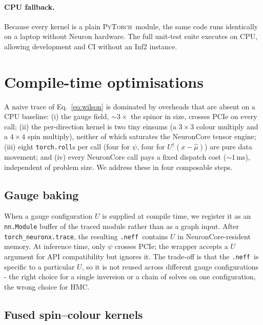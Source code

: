 \documentclass[a4paper,11pt]{article}
\newcommand{\NEFF}{\texttt{.neff}}
\newcommand{\PyT}{\textsc{PyTorch}}
\begin{document}
\paragraph*{CPU fallback.}
Because every kernel is a plain \PyT\ module, the same code runs
identically on a laptop without Neuron hardware. The full unit-test
suite executes on CPU, allowing development and CI without an Inf2
instance.

\section{Compile-time optimisations}
\label{sec:opt}

A naive trace of Eq.~\eqref{eq:wilson} is dominated by overheads that
are absent on a CPU baseline:
(i) the gauge field, $\sim\!3{\times}$ the spinor in size, crosses
PCIe on every call;
(ii) the per-direction kernel is two tiny einsums (a $3{\times}3$
colour multiply and a $4{\times}4$ spin multiply), neither of which
saturates the NeuronCore tensor engine;
(iii) eight \texttt{torch.roll}s per call (four for $\psi$, four for
$U^{\dagger}(x{-}\hat\mu)$) are pure data movement; and
(iv) every NeuronCore call pays a fixed dispatch cost
($\sim\!1\,$ms), independent of problem size. We address these in
four composable steps.

\subsection{Gauge baking}

When a gauge configuration $U$ is supplied at compile time, we register
it as an \texttt{nn.Module} buffer of the traced module rather than as
a graph input. After \texttt{torch\_neuronx.trace}, the resulting
\NEFF\ contains $U$ in NeuronCore-resident memory. At inference time,
only $\psi$ crosses PCIe; the wrapper accepts a $U$ argument for API
compatibility but ignores it. The trade-off is that the \NEFF\ is
specific to a particular $U$, so it is not reused across different
gauge configurations - the right choice for a single inversion or a
chain of solves on one configuration, the wrong choice for HMC.

\subsection{Fused spin--colour kernels}
\end{document}
